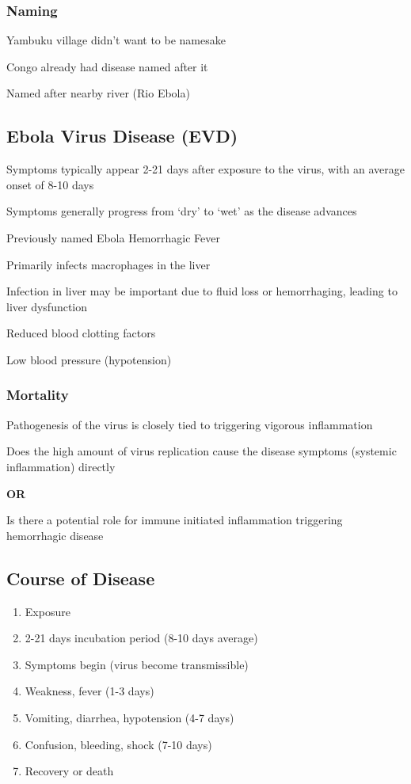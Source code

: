 \documentclass{notes}
\begin{document}
\subsubsection{Naming}

Yambuku village didn't want to be namesake

Congo already had disease named after it

Named after nearby river (Rio Ebola)

\subsection{Ebola Virus Disease (EVD)}

Symptoms typically appear 2-21 days after exposure to the virus, with an average onset of 8-10 days

Symptoms generally progress from `dry' to `wet' as the disease advances


Previously named Ebola Hemorrhagic Fever

Primarily infects macrophages in the liver

\tab \indicates Infection in liver may be important due to fluid loss or hemorrhaging, leading to liver dysfunction

\tab Reduced blood clotting factors

\tab Low blood pressure (hypotension)

\subsubsection{Mortality}

Pathogenesis of the virus is closely tied to triggering vigorous inflammation

Does the high amount of virus replication cause the disease symptoms (systemic inflammation) directly

\textbf{OR}

Is there a potential role for immune initiated inflammation triggering hemorrhagic disease

\subsection{Course of Disease}

\begin{enumerate}
    \item Exposure
    \item 2-21 days incubation period (8-10 days average)
    \item Symptoms begin (virus become transmissible)
    \item Weakness, fever (1-3 days)
    \item Vomiting, diarrhea, hypotension (4-7 days)
    \item Confusion, bleeding, shock (7-10 days)
    \item Recovery or death
\end{enumerate}
\end{document}
